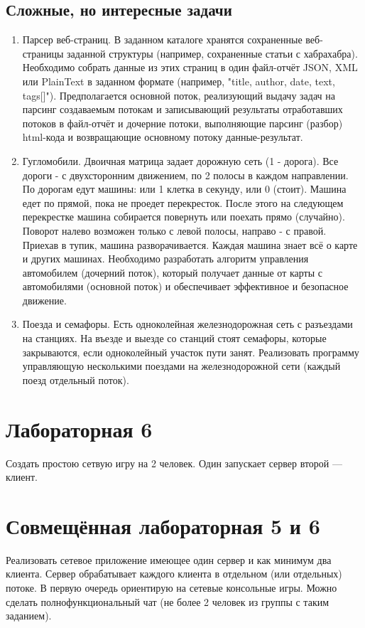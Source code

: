 \documentclass[12pt]{article}
\begin{document}
\subsection*{Сложные, но интересные задачи}
\begin{enumerate}
	\item Парсер веб-страниц.
В заданном каталоге хранятся сохраненные веб-страницы заданной структуры 
(например, сохраненные статьи с хабрахабра). Необходимо собрать данные из этих 
страниц в один файл-отчёт JSON, XML или PlainText в заданном формате (например, 
"title, author, date, text, tags[]"). Предполагается основной поток, реализующий 
выдачу задач на парсинг создаваемым потокам и записывающий результаты 
отработавших потоков в файл-отчёт и дочерние потоки, выполняющие парсинг 
(разбор) html-кода и возвращающие основному потоку данные-результат.

\item Гугломобили.
Двоичная матрица задает дорожную сеть (1 - дорога). Все дороги - с двухсторонним 
движением, по 2 полосы в каждом направлении. По дорогам едут машины: или 1 
клетка в секунду, или 0 (стоит). Машина едет по прямой, пока не проедет 
перекресток. После этого на следующем перекрестке машина собирается повернуть 
или поехать прямо (случайно). Поворот налево возможен только с левой полосы, 
направо - с правой. Приехав в тупик, машина разворачивается. Каждая машина знает 
всё о карте и других машинах. Необходимо разработать алгоритм управления 
автомобилем (дочерний поток), который получает данные от карты с автомобилями 
(основной поток) и обеспечивает эффективное и безопасное движение.

\item Поезда и семафоры.
Есть  одноколейная железнодорожная сеть с разъездами на станциях. На въезде и 
выезде со станций стоят семафоры, которые закрываются, если одноколейный 
участок пути занят. Реализовать программу управляющую несколькими поездами на 
железнодорожной сети (каждый поезд отдельный поток).
\end{enumerate}

\section*{Лабораторная 6}

Создать простою сетвую игру на 2 человек. Один запускает сервер второй --- 
клиент.

\section*{Совмещённая лабораторная 5 и 6}

Реализовать сетевое приложение имеющее один сервер и как минимум два клиента. 
Сервер обрабатывает каждого клиента в отдельном (или отдельных) потоке. В 
первую очередь ориентирую на сетевые консольные игры. Можно сделать 
полнофункциональный чат (не более 2 человек из группы с таким заданием).
\end{document}

